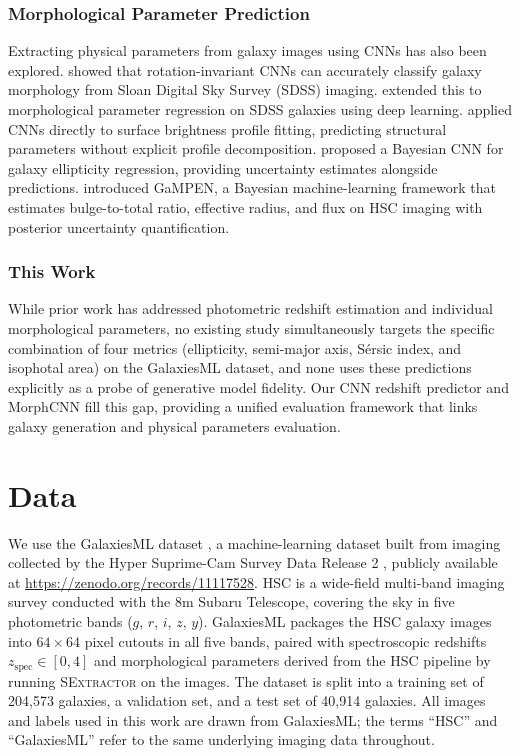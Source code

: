 \documentclass[fleqn,usenatbib]{mnras}
\begin{document}
\subsubsection{Morphological Parameter Prediction}

Extracting physical parameters from galaxy images using CNNs has also
been explored.
\citet{dieleman2015} showed that rotation-invariant CNNs can accurately
classify galaxy morphology from Sloan Digital Sky Survey (SDSS) imaging.
\citet{dominguezsanchez2018} extended this to morphological parameter
regression on SDSS galaxies using deep learning.
\citet{tuccillo2018} applied CNNs directly to surface brightness profile
fitting, predicting structural parameters without explicit profile
decomposition.
\citet{theobald2021} proposed a Bayesian CNN for galaxy ellipticity
regression, providing uncertainty estimates alongside predictions.
\citet{ghosh2022} introduced GaMPEN, a Bayesian machine-learning
framework that estimates bulge-to-total ratio, effective radius, and
flux on HSC imaging with posterior uncertainty quantification.

\subsubsection{This Work}

While prior work has addressed photometric redshift estimation and
individual morphological parameters, no existing study
simultaneously targets the specific combination of four metrics (ellipticity, semi-major axis, S\'{e}rsic index, and isophotal
area) on the GalaxiesML dataset, and none uses these predictions
explicitly as a probe of generative model fidelity.
Our CNN redshift predictor and MorphCNN fill this gap, providing a unified evaluation framework
that links galaxy generation and physical parameters evaluation.

\section{Data}

We use the GalaxiesML dataset \citep{li2024a}, a machine-learning
dataset built from imaging collected by the Hyper Suprime-Cam
Survey Data Release 2 \citep{aihara2019}, publicly available at
\url{https://zenodo.org/records/11117528}.
HSC is a wide-field multi-band imaging survey conducted with
the 8m Subaru Telescope, covering the sky in five photometric
bands ($g$, $r$, $i$, $z$, $y$).
GalaxiesML packages the HSC galaxy images into $64 \times 64$ pixel
cutouts in all five bands, paired with spectroscopic redshifts
$z_{\mathrm{spec}} \in [0, 4]$ and morphological parameters derived
from the HSC pipeline by running \textsc{SExtractor} \citep{bertin1996}
on the images.
The dataset is split into a training set of 204,573 galaxies, a
validation set, and a test set of 40,914 galaxies.
All images and labels used in this work are drawn from GalaxiesML;
the terms ``HSC'' and ``GalaxiesML'' refer to the same underlying
imaging data throughout.
\end{document}
